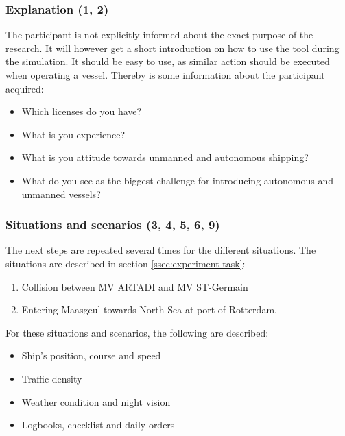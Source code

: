 \subsubsection{Explanation (1, 2)}
The participant is not explicitly informed about the exact purpose of the research. It will however get a short introduction on how to use the tool during the simulation. It should be easy to use, as similar action should be executed when operating a vessel. Thereby is some information about the participant acquired:
\begin{itemize}
	\item Which licenses do you have?
	\item What is you experience?
	\item What is you attitude towards unmanned and autonomous shipping?
	\item What do you see as the biggest challenge for introducing autonomous and unmanned vessels?
\end{itemize}


\subsubsection{Situations and scenarios (3, 4, 5, 6, 9)}
The next steps are repeated several times for the different situations. The situations are described in section \ref{ssec:experiment-task}:
\begin{enumerate}
	\item Collision between MV ARTADI and MV ST-Germain
	\item Entering Maasgeul towards North Sea at port of Rotterdam.
\end{enumerate}

For these situations and scenarios, the following are described:
\begin{itemize}
	\item Ship's position, course and speed
	\item Traffic density
	\item Weather condition and night vision
	\item Logbooks, checklist and daily orders
\end{itemize}


